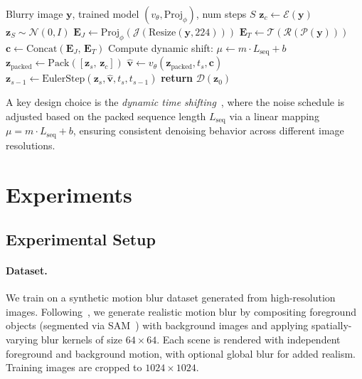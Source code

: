 \documentclass{article}
\begin{document}
\begin{algorithm}[t]
\caption{JEPA-Flux Inference}
\label{alg:inference}
\begin{algorithmic}[1]
\REQUIRE Blurry image $\mathbf{y}$, trained model $(v_\theta, \text{Proj}_\phi)$, num steps $S$
\STATE $\mathbf{z}_c \leftarrow \mathcal{E}(\mathbf{y})$ \hfill{}
\STATE $\mathbf{z}_S \sim \mathcal{N}(0, I)$ \hfill{}
\STATE $\mathbf{E}_J \leftarrow \text{Proj}_\phi(\mathcal{J}(\text{Resize}(\mathbf{y}, 224)))$ \hfill{}
\STATE $\mathbf{E}_T \leftarrow \mathcal{T}(\mathcal{R}(\mathcal{P}(\mathbf{y})))$ \hfill{}
\STATE $\mathbf{c} \leftarrow \text{Concat}(\mathbf{E}_J,\, \mathbf{E}_T)$
\STATE Compute dynamic shift: $\mu \leftarrow m \cdot L_{\text{seq}} + b$ \hfill{}
    \STATE $\mathbf{z}_{\text{packed}} \leftarrow \text{Pack}([\mathbf{z}_s,\, \mathbf{z}_c])$
    \STATE $\hat{\mathbf{v}} \leftarrow v_\theta(\mathbf{z}_{\text{packed}}, t_s, \mathbf{c})$
    \STATE $\mathbf{z}_{s-1} \leftarrow \text{EulerStep}(\mathbf{z}_s, \hat{\mathbf{v}}, t_s, t_{s-1})$
\ENDFOR
\STATE \textbf{return} $\mathcal{D}(\mathbf{z}_0)$ \hfill{}
\end{algorithmic}
\end{algorithm}

A key design choice is the \emph{dynamic time shifting}~\cite{flux2024}, where the noise schedule is adjusted based on the packed sequence length $L_{\text{seq}}$ via a linear mapping $\mu = m \cdot L_{\text{seq}} + b$, ensuring consistent denoising behavior across different image resolutions.

\section{Experiments}
\label{sec:experiments}

\subsection{Experimental Setup}

\paragraph{Dataset.}
We train on a synthetic motion blur dataset generated from high-resolution images. Following~\cite{nah2017deep}, we generate realistic motion blur by compositing foreground objects (segmented via SAM~\cite{kirillov2023segment}) with background images and applying spatially-varying blur kernels of size $64 \times 64$. Each scene is rendered with independent foreground and background motion, with optional global blur for added realism. Training images are cropped to $1024 \times 1024$.
\end{document}
